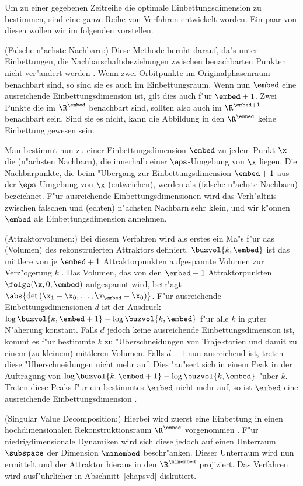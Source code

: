 Um zu einer gegebenen Zeitreihe die optimale Einbettungsdimension zu bestimmen, sind eine
ganze Reihe von Verfahren entwickelt worden. Ein paar von diesen wollen wir im folgenden
vorstellen.
\begin{myitemize}
\item \rem(Falsche n"achste Nachbarn:) Diese Methode beruht darauf, da"s unter
  Einbettungen, die Nachbarschaftsbeziehungen zwischen benachbarten Punkten nicht
  ver\-"an\-dert werden \cite{Kennel92}. Wenn zwei Orbitpunkte im Originalphasenraum benachbart
  sind, so sind sie es auch im Einbettungsraum. Wenn nun $\embed$ eine ausreichende
  Einbettungsdimension ist, gilt dies auch f"ur $\embed+1$. Zwei Punkte die im $\R^\embed$
  benachbart sind, sollten also auch im $\R^{\embed+1}$ benachbart sein. Sind sie es
  nicht, kann die Abbildung in den $\R^\embed$ keine Einbettung gewesen sein.
  
  Man bestimmt nun zu einer Einbettungsdimension $\embed$ zu jedem Punkt $\x$ die
  \begriff(n"ach\-sten Nachbarn), die innerhalb einer $\eps$-Umgebung  von $\x$ liegen. Die
  Nachbarpunkte, die beim "Ubergang zur Einbettungsdimension $\embed+1$ aus der
  $\eps$-Umgebung von $\x$ \metapher(entweichen), werden als \begriff(falsche n"achste
  Nachbarn) bezeichnet. F"ur ausreichende Einbettungsdimensionen wird das Verh"altnis
  zwischen falschen und \metapher(echten) n"achsten Nachbarn sehr klein, und wir
  k"onnen $\embed$ als Einbettungsdimension annehmen.
  
\item \rem(Attraktorvolumen:) Bei diesem Verfahren wird als erstes ein Ma"s f"ur das
  \metapher(Volumen) des rekonstruierten Attraktors definiert. $\buzvol{k,\embed}$ ist das
  mittlere von je $\embed+1$ Attraktorpunkten aufgespannte Volumen zur Verz"ogerung $k$ .
  Das Volumen, das von den $\embed+1$ Attraktorpunkten $\folge(\x,0,\embed)$ aufgespannt
  wird, betr"agt $\abs{\det\left(\x_1-\x_0,\dots,\x_\embed-\x_0\right)}$.  F"ur
  ausreichende Einbettungsdimensionen $d$ ist der Ausdruck
  $\log\buzvol{k,\embed+1}-\log\buzvol{k,\embed}$ f"ur alle $k$ in guter N"aherung
  konstant. Falls $d$ jedoch keine ausreichende Einbettungsdimension ist, kommt es f"ur
  bestimmte $k$ zu "Uberschneidungen von Trajektorien und damit zu einem \naja(zu
  kleinem) mittleren Volumen. Falls $d+1$ nun
  ausreichend ist, treten diese "Uberschneidungen nicht mehr auf. Dies "au"sert sich in
  einem Peak in der Auftragung von $\log\buzvol{k,\embed+1}-\log\buzvol{k,\embed}$ "uber
  $k$. Treten diese Peaks f"ur ein bestimmtes $\embed$ nicht mehr auf, so ist $\embed$
  eine ausreichende Einbettungsdimension \cite{Buzug94,Buzug90a}.

\item \rem(Singular Value Decomposition:) Hierbei
  wird zuerst eine Einbettung in einen hochdimensionalen Rekonstruktionsraum $\R^\embed$
  vorgenommen \cite{Broomhead-king}. F"ur niedrigdimensionale Dynamiken wird sich diese
  jedoch auf einen Unterraum $\subspace$ der Dimension $\minembed$ beschr"anken. Dieser
  Unterraum wird nun ermittelt und der Attraktor hieraus in den $\R^\minembed$ projiziert.
  Das Verfahren wird ausf"uhrlicher in Abschnitt~\ref{chapsvd} diskutiert.
\end{myitemize}
